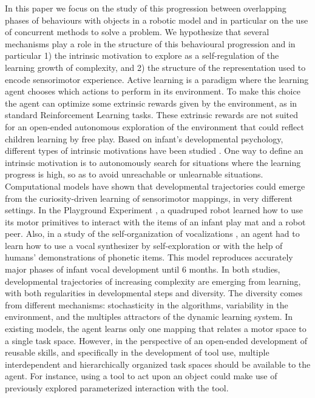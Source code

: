 \documentclass[10pt,letterpaper]{article}
\begin{document}
	In this paper we focus on the study of this progression between overlapping phases of behaviours with objects in a robotic model and in particular on the use of concurrent methods to solve a problem.	
	We hypothesize that several mechanisms play a role in the structure of this behavioural progression and in particular 
	1) the intrinsic motivation to explore as a self-regulation of the learning growth of complexity, and 
	2) the structure of the representation used to encode sensorimotor experience.	
	Active learning is a paradigm where the learning agent chooses which actions to perform in its environment.
	To make this choice the agent can optimize some extrinsic rewards given by the environment, as in standard Reinforcement Learning tasks.
	These extrinsic rewards are not suited for an open-ended autonomous exploration of the environment that could reflect children learning by free play.
	Based on infant's developmental psychology, different types of intrinsic motivations have been studied \cite{santucci2013}.
	One way to define an intrinsic motivation is to autonomously search for situations where the learning progress is high, so as to avoid unreachable or unlearnable situations.
	Computational models have shown that developmental trajectories could emerge from the curiosity-driven learning of sensorimotor mappings, in very different settings.
	In the Playground Experiment \cite{oudeyer_what_2007}, a quadruped robot learned how to use its motor primitives to interact with the items of an infant play mat and a robot peer.
	Also, in a study of the self-organization of vocalizations \cite{moulin-frier_self-organization_2014}, an agent had to learn how to
	use a vocal synthesizer by self-exploration or with the help of humans' demonstrations of phonetic items. 
	This model reproduces accurately major phases of infant vocal development until $6$ months.
	In both studies, developmental trajectories of increasing complexity are emerging from learning, with both regularities in developmental steps and diversity.
	The diversity comes from different mechanisms: stochasticity in the algorithms, variability in the environment, and the multiples attractors of the dynamic learning system.
	In existing models, the agent learns only one mapping that relates a motor space to a single task space. 
	However, in the perspective of an open-ended development of reusable skills, and specifically in the development of tool use, multiple interdependent and hierarchically organized task spaces should be available to the agent.
	For instance, using a tool to act upon an object could make use of previously explored parameterized interaction with the tool.
	
\end{document}
